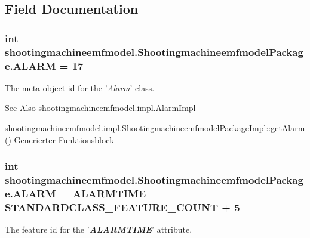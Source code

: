 \subsection{Field Documentation}
\hypertarget{interfaceshootingmachineemfmodel_1_1_shootingmachineemfmodel_package_adae05455839bcd40f9790082ac94aabc}{
\subsubsection[{A\-L\-A\-R\-M}]{\setlength{\rightskip}{0pt plus 5cm}int shootingmachineemfmodel.\-Shootingmachineemfmodel\-Package.\-A\-L\-A\-R\-M = 17}}\label{interfaceshootingmachineemfmodel_1_1_shootingmachineemfmodel_package_adae05455839bcd40f9790082ac94aabc}
The meta object id for the '\hyperlink{classshootingmachineemfmodel_1_1impl_1_1_alarm_impl}{{\itshape Alarm}}' class.

\begin{DoxySeeAlso}{See Also}
\hyperlink{classshootingmachineemfmodel_1_1impl_1_1_alarm_impl}{shootingmachineemfmodel.\-impl.\-Alarm\-Impl} 

\hyperlink{classshootingmachineemfmodel_1_1impl_1_1_shootingmachineemfmodel_package_impl_aae7572a42a9d2658df63f0aea15ccf62}{shootingmachineemfmodel.\-impl.\-Shootingmachineemfmodel\-Package\-Impl\-::get\-Alarm()} Generierter Funktionsblock 
\end{DoxySeeAlso}
\hypertarget{interfaceshootingmachineemfmodel_1_1_shootingmachineemfmodel_package_ac5eb3c5a5b86a0035eaf0b1d873ada39}{
\subsubsection[{A\-L\-A\-R\-M\-\_\-\-\_\-\-A\-L\-A\-R\-M\-T\-I\-M\-E}]{\setlength{\rightskip}{0pt plus 5cm}int shootingmachineemfmodel.\-Shootingmachineemfmodel\-Package.\-A\-L\-A\-R\-M\-\_\-\-\_\-\-A\-L\-A\-R\-M\-T\-I\-M\-E = {\bf S\-T\-A\-N\-D\-A\-R\-D\-C\-L\-A\-S\-S\-\_\-\-F\-E\-A\-T\-U\-R\-E\-\_\-\-C\-O\-U\-N\-T} + 5}}\label{interfaceshootingmachineemfmodel_1_1_shootingmachineemfmodel_package_ac5eb3c5a5b86a0035eaf0b1d873ada39}
The feature id for the '{\itshape {\bfseries A\-L\-A\-R\-M\-T\-I\-M\-E}}' attribute.

